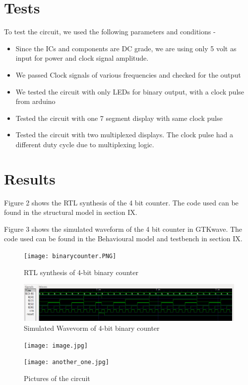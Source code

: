 \documentclass[twoside,twocolumn]{article}
\begin{document}
\section{Tests}
To test the circuit, we used the following parameters and conditions - 
\begin{itemize}
	\item Since the ICs and components are DC grade, we are using only 5 volt as input for power and clock signal amplitude.
	\item We passed Clock signals of various frequencies and checked for the output
	\item We tested the circuit with only LEDs for binary output, with a clock pulse from arduino
	\item Tested the circuit with one 7 segment display with same clock pulse
	\item Tested the circuit with two multiplexed displays. The clock pulse had a different duty cycle due to multiplexing logic.  
\end{itemize}

\section{Results}

	Figure 2 shows the RTL synthesis of the 4 bit counter.
The code used can be found in the structural model in section IX.

Figure 3 shows the simulated waveform of the 4 bit counter in GTKwave.
The code used can be found in the Behavioural model and testbench in section IX. 

\begin{figure}[htp]
	\caption{RTL synthesis of 4-bit binary counter}
	\texttt{[image: binarycounter.PNG]}
\end{figure}

\begin{figure}[t]
	\caption{Simulated Wavevorm of 4-bit binary counter}
	\includegraphics[width=\linewidth]{Waveform.png}
\end{figure}

\begin{figure}[t]
	\caption{Pictures of the circuit}
	\texttt{[image: image.jpg]}
	
	
	\texttt{[image: another\_one.jpg]}
\end{figure}
\end{document}
